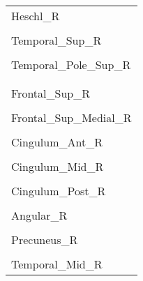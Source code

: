 \documentclass[
]{article}
\begin{document}
\begin{table}[htbp]
\begin{tabular}[t]{l}
\hspace{1em}Heschl\_R\\
\hspace{1em}\cellcolor{gray!6}{Temporal\_Sup\_L}\\
\hspace{1em}Temporal\_Sup\_R\\
\hspace{1em}\cellcolor{gray!6}{Temporal\_Pole\_Sup\_L}\\
\hspace{1em}Temporal\_Pole\_Sup\_R\\
\addlinespace[0.3em]
\multicolumn{1}{l}{\textbf{DMN}}\\
\hspace{1em}\cellcolor{gray!6}{Frontal\_Sup\_L}\\
\hspace{1em}Frontal\_Sup\_R\\
\hspace{1em}\cellcolor{gray!6}{Frontal\_Sup\_Medial\_L}\\
\hspace{1em}Frontal\_Sup\_Medial\_R\\
\hspace{1em}\cellcolor{gray!6}{Cingulum\_Ant\_L}\\
\hspace{1em}Cingulum\_Ant\_R\\
\hspace{1em}\cellcolor{gray!6}{Cingulum\_Mid\_L}\\
\hspace{1em}Cingulum\_Mid\_R\\
\hspace{1em}\cellcolor{gray!6}{Cingulum\_Post\_L}\\
\hspace{1em}Cingulum\_Post\_R\\
\hspace{1em}\cellcolor{gray!6}{Angular\_L}\\
\hspace{1em}Angular\_R\\
\hspace{1em}\cellcolor{gray!6}{Precuneus\_L}\\
\hspace{1em}Precuneus\_R\\
\hspace{1em}\cellcolor{gray!6}{Temporal\_Mid\_L}\\
\hspace{1em}Temporal\_Mid\_R\\

\end{tabular}
\end{table}
\end{document}
